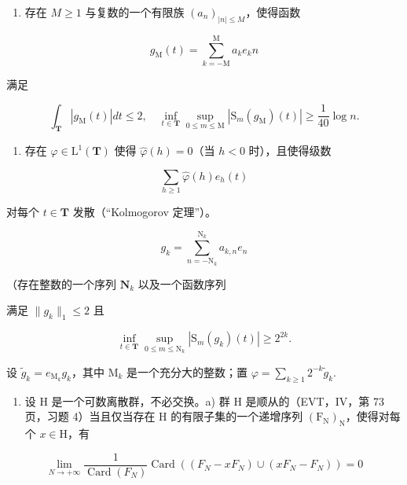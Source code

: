 \begin{enumerate}
\def\labelenumi{\roman{enumi})}
\tightlist
\item
  存在 \(M \geqslant 1\) 与复数的一个有限族 \((a_{n})_{|n| \leqslant M}\)，使得函数
\end{enumerate}

\[
g _ {\mathrm{M}} (t) = \sum_ {k = - \mathrm{M}} ^ {\mathrm{M}} a _ {k} e _ {k} n
\]

满足

\[
\int_ {\mathbf {T}} | g _ {\mathrm{M}} (t) | d t \leqslant 2, \quad \inf _ {t \in \mathbf {T}} \sup _ {0 \leqslant m \leqslant \mathrm{M}} | \mathrm{S} _ {m} (g _ {\mathrm{M}}) (t) | \geqslant \frac {1}{4 0} \log n.
\]

\begin{enumerate}
\def\labelenumi{\alph{enumi})}
\setcounter{enumi}{9}
\tightlist
\item
  存在 \(\varphi\in\mathrm{L}^{1}(\mathbf{T})\) 使得 \(\widehat{\varphi}(h)=0\)（当 \(h<0\) 时），且使得级数
\end{enumerate}

\[
\sum_ {h \geqslant 1} \widehat {\varphi} (h) e _ {h} (t)
\]

对每个 \(t \in \mathbf{T}\) 发散（“Kolmogorov 定理”）。

\[
g _ {k} = \sum_ {n = - \mathrm{N} _ {k}} ^ {\mathrm{N} _ {k}} a _ {k, n} e _ {n}
\]

（存在整数的一个序列 \(\mathbf{N}_k\) 以及一个函数序列

满足 \(\| g_k\| _1\leqslant 2\) 且

\[
\inf _ {t \in \mathbf {T}} \sup _ {0 \leqslant m \leqslant \mathrm{N} _ {k}} | \mathrm{S} _ {m} (g _ {k}) (t) | \geqslant 2 ^ {2 k}.
\]

设 \(\widetilde{g}_k = e_{\mathrm{M}_k}g_k\)，其中 \(\mathrm{M}_k\) 是一个充分大的整数；置 \(\varphi = \sum_{k\geqslant 1}2^{-k}\widetilde{g}_k.\)

\begin{enumerate}
\def\labelenumi{\arabic{enumi})}
\setcounter{enumi}{51}
\tightlist
\item
  设 H 是一个可数离散群，不必交换。a) 群 H 是顺从的（EVT，IV，第 73 页，习题 4）当且仅当存在 H 的有限子集的一个递增序列 \((\mathrm{F_N})_{\mathrm{N}}\)，使得对每个 \(x \in \mathrm{H}\)，有
\end{enumerate}

\[
\lim _ {N \to + \infty} \frac {1}{\operatorname{Card} (F _ {N})} \operatorname{Card} ((F _ {N} - x F _ {N}) \cup (x F _ {N} - F _ {N})) = 0
\]

